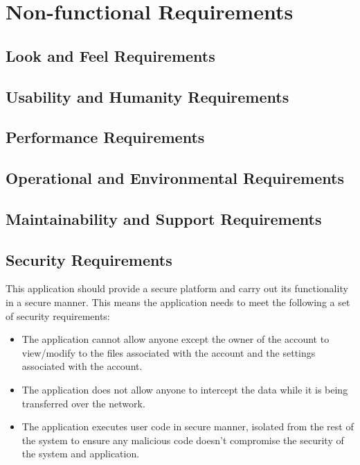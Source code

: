 \documentclass[12pt, titlepage]{article}
\begin{document}
\section{Non-functional Requirements}

  \subsection{Look and Feel Requirements}

  \subsection{Usability and Humanity Requirements}

  \subsection{Performance Requirements}

  \subsection{Operational and Environmental Requirements}

  \subsection{Maintainability and Support Requirements}

  \subsection{Security Requirements}
  This application should provide a secure platform and carry out its
  functionality in a secure manner. This means the application needs to meet
  the following a set of security requirements:
  \begin{itemize}
    \item The application cannot allow anyone except the owner of the account
      to view/modify to the files associated with the account and the settings
      associated with the account.
    \item The application does not allow anyone to intercept the data while it
      is being transferred over the network.
    \item The application executes user code in secure manner, isolated from
      the rest of the system to ensure any malicious code doesn't compromise
      the security of the system and application.
  \end{itemize}
\end{document}
